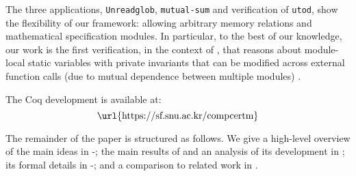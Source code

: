 The three applications, \texttt{Unreadglob}, \texttt{mutual-sum} and
verification of \texttt{utod}, show the flexibility of our framework:
allowing arbitrary memory relations and mathematical specification
modules. In particular, to the best of our knowledge, our work is the
first verification, in the context of \cc{}, that reasons about module-local static
variables with private invariants that can be modified across external function calls (due to
mutual dependence between multiple modules) .

The Coq development is available at:
\[ \text{\url{https://sf.snu.ac.kr/compcertm}} \]

The remainder of the paper is structured as follows.
We give a high-level overview of the main ideas in
-;
the main results of \ccm{} and an analysis of its development in ;
its formal details in -;
and a comparison to related work in .




